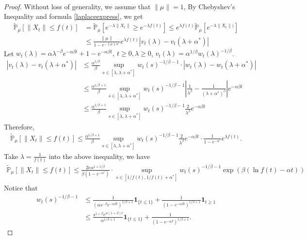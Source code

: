 \documentclass[12pt, a4paper]{amsart}
\theoremstyle{definition}
\numberwithin{equation}{section}
\begin{document}
\begin{proof}
 Without loss of generality, we assume that $\|\mu\|=1$, By Chebyshev's Inequality and formula \eqref{laplaceexpress}, we get 
\begin{align*}
    \mathbb{\tilde{P}}_{\mu}[\|X_t\|\leq f(t)]&=\mathbb{\tilde{P}}_{\mu}[e^{-\lambda\|X_t\|}\geq e^{-\lambda f(t)}]\leq e^{\lambda f(t)}\mathbb{\tilde{P}}_{\mu}[e^{-\lambda \|X_t\|)}]\\
    &\leq \frac{\|\mu\|}{1-e^{-\|\mu\|\alpha^*}}e^{\lambda f(t)}\left|v_t(\lambda)-v_t(\lambda+\alpha^*)\right|
\end{align*}
Let $w_t(\lambda)=\alpha \lambda^{-\beta}e^{-\alpha \beta t}+1-e^{-\alpha\beta t},~ t\geq 0,\lambda\geq0$, $v_t(\lambda)=\alpha^{1/\beta}w_t(\lambda)^{-1/\beta}$.
\begin{align*}
    \left|v_t(\lambda)-v_t(\lambda+\alpha^*)\right|&\leq\frac {\alpha^{1/\beta}}{\beta}\sup_{s\in [\lambda,\lambda+\alpha^*]}w_t(s)^{-1/\beta-1}\cdot\left|w_t(\lambda)-w_t(\lambda+\alpha^*)\right|\\
    &\leq  \frac{\alpha^{1/\beta+1}}{\beta}\sup_{s\in [\lambda,\lambda+\alpha^*]}w_t(s)^{-1/\beta-1}\left|\frac{1}{\lambda^{\beta}}-\frac{1}{(\lambda+\alpha^*)^{\beta}}\right|e^{-\alpha\beta t}\\
    &\leq  \frac{\alpha^{1/\beta+1}}{\beta}\sup_{s\in [\lambda,\lambda+\alpha^*]}w_t(s)^{-1/\beta-1}\frac{2}{\lambda^{\beta}}e^{-\alpha\beta t}
\end{align*}
Therefore, 
\begin{align*}
    \mathbb{\tilde{P}}_{\mu}[\|X_t\|\leq f(t)]\leq \frac{\alpha^{1/\beta+1}}{\beta}\sup_{s\in [\lambda,\lambda+\alpha^*]}w_t(s)^{-1/\beta-1}\frac{2}{\lambda^{\beta}}e^{-\alpha\beta t}\cdot \frac{1}{1-e^{-\alpha^*}} e^{\lambda f(t)}.  
\end{align*}
Take $\lambda=\frac{1}{f(t)}$ into the above inequality, we have
\begin{align*}
    \mathbb{\tilde{P}}_{\mu}[\|X_t\|\leq f(t)]\leq \frac{2 e \alpha^{1+1/\beta}}{\beta (1-e^{-\alpha^*})}\cdot\sup_{s\in [1/f(t),1/f(t)+\alpha^*]}w_t(s)^{-1/\beta-1}\exp(\beta(\ln f(t)-\alpha t))
\end{align*}
Notice that 
\begin{align*}
    w_t(s)^{-1/\beta-1}&\leq \frac{1}{(\alpha s^{-\beta}e^{-\alpha \beta t})^{1/
    \beta+1}}\mathbf{1}_{\{t\leq 1\}}+\frac{1}{(1-e^{-\alpha\beta t})^{1/\beta+1}}\mathbf{1}_{t\geq 1}\\
    &\leq \frac{s^{1+\beta}e^{\alpha(1+\beta)t}}{\alpha^{1/\beta +1}}\mathbf{1}_{\{t\leq 1\}}+\frac{1}{(1-e^{-\alpha\beta })^{1/\beta+1}}. 

\end{align*}
\end{proof}
\end{document}
